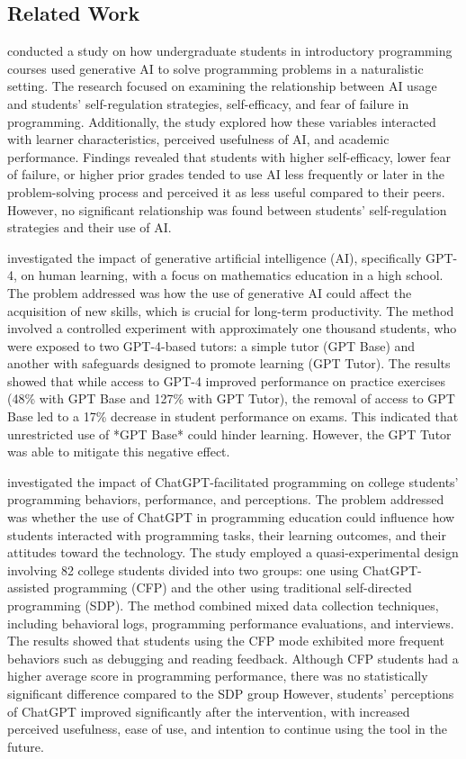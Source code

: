 \documentclass[a4paper,twoside]{article}
\begin{document}
\subsection{Related Work}

\cite{Margulieux24} conducted a study on how undergraduate students in
introductory programming courses used generative AI to solve programming
problems in a naturalistic setting. The research focused on examining the
relationship between AI usage and students’ self-regulation strategies,
self-efficacy, and fear of failure in programming. Additionally, the study
explored how these variables interacted with learner characteristics, perceived
usefulness of AI, and academic performance. Findings revealed that students with
higher self-efficacy, lower fear of failure, or higher prior grades tended to
use AI less frequently or  later in the problem-solving process and perceived it
as less useful compared to their peers. However, no significant relationship was
found between students’ self-regulation strategies and their use of AI.

\cite{Bastani24} investigated the impact of generative artificial intelligence
(AI), specifically GPT-4, on human learning, with a focus on mathematics
education in a high school. The problem addressed was how the use of generative
AI could affect the acquisition of new skills, which is crucial for long-term
productivity. The method involved a controlled experiment with approximately
one thousand students, who were exposed to two GPT-4-based tutors: a simple
tutor (GPT Base) and another with safeguards designed to promote learning
(GPT Tutor). The results showed that while access to GPT-4 improved performance
on practice exercises (48\% with GPT Base and 127\% with GPT Tutor), the removal
of access to GPT Base led to a 17\% decrease in student performance on exams.
This indicated that unrestricted use of *GPT Base* could hinder learning.
However, the GPT Tutor was able to mitigate this negative effect.

\cite{Boudouaia24} investigated the impact of ChatGPT-facilitated programming on
college students’ programming behaviors, performance, and perceptions. The
problem addressed was whether the use of ChatGPT in programming education could
influence how students interacted with programming tasks, their learning
outcomes, and their attitudes toward the technology. The study employed a
quasi-experimental design involving 82 college students divided into two
groups: one using ChatGPT-assisted programming (CFP) and the other using
traditional self-directed programming (SDP). The method combined mixed data
collection techniques, including behavioral logs, programming performance
evaluations, and interviews. The results showed that students using the CFP mode
exhibited more frequent behaviors such as debugging and reading feedback.
Although CFP students had a higher average score in programming performance,
there was no statistically significant difference compared to the SDP group
However, students’ perceptions of ChatGPT improved significantly after the
intervention, with increased perceived usefulness, ease of use, and intention to
continue using the tool in the future.
\end{document}
